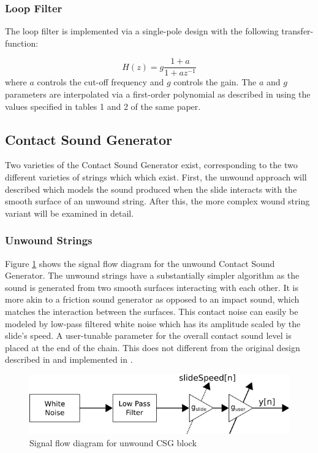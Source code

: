 \documentclass[../main.tex]{subfiles}
\begin{document}
\subsubsection{Loop Filter}
The loop filter is implemented via a single-pole design with the following transfer-function:

\begin{equation}
    H(z) = g \frac{1 + a}{1 + a z^{-1}}
    \label{eqn:one-pole}
\end{equation}
where $a$ controls the cut-off frequency and $g$ controls the gain. The $a$ and $g$ parameters are interpolated via a first-order polynomial as described in  using the values specified in tables 1 and 2 of the same paper.

\subsection{Contact Sound Generator}
Two varieties of the Contact Sound Generator exist, corresponding to the two different varieties of strings which which exist. First, the unwound approach will described which models the sound produced when the slide interacts with the smooth surface of an unwound string. After this, the more complex wound string variant will be examined in detail.

\subsubsection{Unwound Strings}
Figure \ref{fig:CSG_unwound} shows the signal flow diagram for the unwound Contact Sound Generator. The unwound strings have a substantially simpler algorithm as the sound is generated from two smooth surfaces interacting with each other. It is more akin to a friction sound generator as opposed to an impact sound, which matches the interaction between the surfaces. This contact noise can easily be modeled by low-pass filtered white noise which has its amplitude scaled by the slide's speed. A user-tunable parameter for the overall contact sound level is placed at the end of the chain. This does not different from the original design described in  and implemented in .

\begin{figure}[h]
    \centering
    \includegraphics[scale=.5]{./images/diagrams/CSG_unwound.png}
    \caption{Signal flow diagram for unwound CSG block}
    \label{fig:CSG_unwound}
\end{figure}
\end{document}
